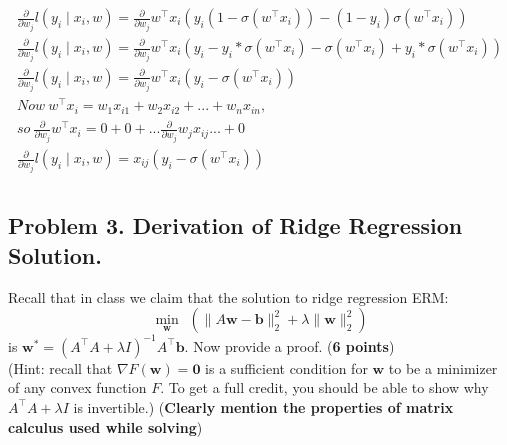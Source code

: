\documentclass[11pt]{scrartcl}
\newcommand{\bw}{\mathbf{w}}
\newcommand{\bb}{\mathbf{b}}
\begin{document}
\begin{gather*}
	\frac{\partial }{\partial w_j}l(y_i\mid x_i,w) = \frac{\partial }{\partial w_j}w^\intercal x_i(y_i(1-\sigma(w^\intercal x_i)) - (1-y_i)\sigma(w^\intercal x_i))\\
	\frac{\partial }{\partial w_j}l(y_i\mid x_i,w) = \frac{\partial }{\partial w_j}w^\intercal x_i(y_i- y_i*\sigma(w^\intercal x_i) - \sigma(w^\intercal x_i)+y_i*\sigma(w^\intercal x_i))\\
	\frac{\partial }{\partial w_j}l(y_i\mid x_i,w) = \frac{\partial }{\partial w_j}w^\intercal x_i(y_i - \sigma(w^\intercal x_i))\\
	Now\ w^\intercal x_i = w_1 x_{i1} + w_2 x_{i2} + . . . + w_n x_{in},\\
	so\ \frac{\partial }{\partial w_j}w^\intercal x_i = 0 + 0 + ...\frac{\partial }{\partial w_j}w_j x_{ij}...+ 0\\
	\frac{\partial }{\partial w_j}l(y_i\mid x_i,w) = x_{ij}(y_i - \sigma(w^\intercal x_i))\\
	\end{gather*}
	
	
	
	
	
	
	\subsection*{Problem 3. Derivation of Ridge Regression Solution.}
	Recall that in class we claim that the solution to ridge regression ERM:
	\[
	\min_{\bw} \hspace{5pt}(\|A \bw - \bb\|_2^2 + \lambda \|\bw\|_2^2)
	\]
	is $\bw^* = (A^\intercal A + \lambda I)^{-1}A^\intercal \bb$. Now provide a proof. (\textbf{6 points})\\
	(Hint: recall that $\nabla F(\bw) = \textbf{0}$ is a sufficient condition for $\bw$ to be a minimizer of any convex function $F$. To get a full credit, you should be able to show why $A^\intercal A + \lambda I$ is invertible.)
	(\textbf{Clearly mention the properties of matrix calculus used while solving})
\end{document}
